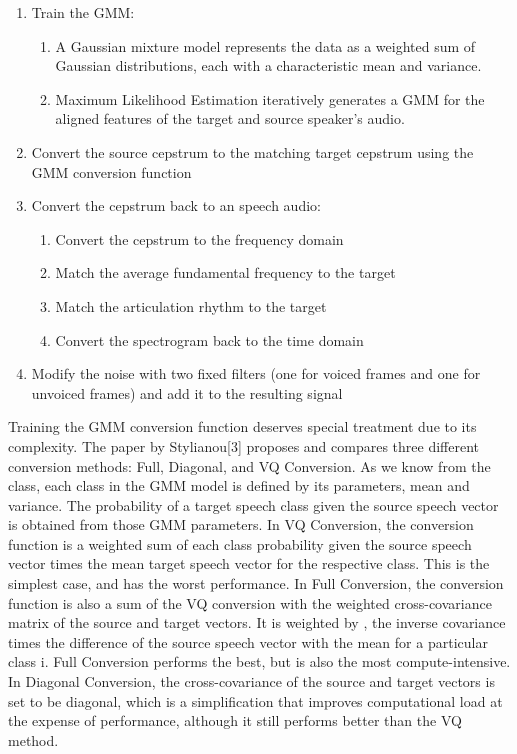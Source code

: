 \documentclass{article}
\begin{document}
\begin{enumerate}
\item Train the GMM:
\begin{enumerate}
\item A Gaussian mixture model represents the data as a weighted sum of Gaussian distributions, each with a characteristic mean and variance.
\item Maximum Likelihood Estimation iteratively generates a GMM for the aligned features of the target and source speaker's audio.
\end{enumerate}

\item Convert the source cepstrum to the matching target cepstrum using the GMM conversion function
\item Convert the cepstrum back to an speech audio:
\begin{enumerate}
\item Convert the cepstrum to the frequency domain
\item Match the average fundamental frequency to the target
\item Match the articulation rhythm to the target 
\item Convert the spectrogram back to the time domain
\end{enumerate}

\item Modify the noise with two fixed filters (one for voiced frames and one for unvoiced frames) and add it to the resulting signal
\end{enumerate}

Training the GMM conversion function deserves special treatment due to its complexity. The paper by Stylianou[3] proposes and compares three different conversion methods: Full, Diagonal, and VQ Conversion. As we know from the class, each class in the GMM model is defined by its parameters, mean and variance. The probability of a target speech class given the source speech vector is obtained from those GMM parameters. In VQ Conversion, the conversion function is a weighted sum of each class probability given the source speech vector times the mean target speech vector for the respective class. This is the simplest case, and has the worst performance.  In Full Conversion, the conversion function is also a sum of the VQ conversion with the weighted cross-covariance matrix of the source and target vectors. It is weighted by , the inverse covariance times the difference of the source speech vector with the mean for a particular class i. Full Conversion performs the best, but is also the most compute-intensive. In Diagonal Conversion, the cross-covariance of the source and target vectors is set to be diagonal, which is a simplification that improves computational load at the expense of performance, although it still performs better than the VQ method. 
\end{document}
